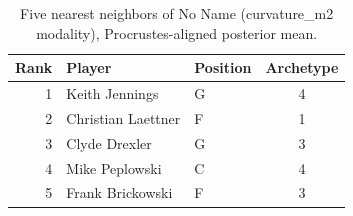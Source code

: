 \begin{table}[htbp]
  \centering\small
  \begin{tabular}{rllc}
    \toprule
    Rank & Player & Position & Archetype \\
    \midrule
    1 & Keith Jennings & G & 4 \\
    2 & Christian Laettner & F & 1 \\
    3 & Clyde Drexler & G & 3 \\
    4 & Mike Peplowski & C & 4 \\
    5 & Frank Brickowski & F & 3 \\
    \bottomrule
  \end{tabular}
  \caption{Five nearest neighbors of No Name (curvature_m2 modality), Procrustes-aligned posterior mean.}
  \label{tab:No_Name_neighbors_curvature_m2}
\end{table}

